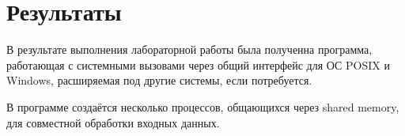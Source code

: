 \section{Результаты}

В результате выполнения лабораторной работы была полученна программа, работающая с системными вызовами через общий интерфейс для ОС POSIX и Windows, расширяемая под другие системы, если потребуется.

В программе создаётся несколько процессов, общающихся через shared memory, для совместной обработки входных данных.

